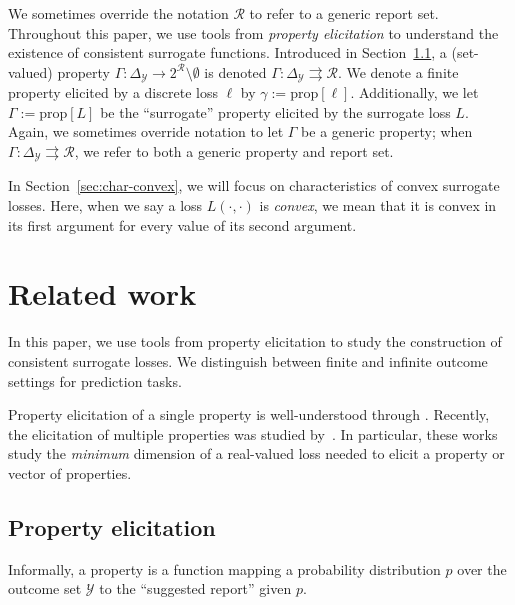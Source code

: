 \documentclass{article}
\newcommand{\simplex}{\Delta_\Y}
\newcommand{\prop}[1]{\mathrm{prop}[#1]}
\newcommand{\R}{\mathcal{R}}
\newcommand{\Y}{\mathcal{Y}}
\newcommand{\toto}{\rightrightarrows}
\begin{document}
We sometimes override the notation $\R$ to refer to a generic report set.
Throughout this paper, we use tools from \emph{property elicitation} to understand the existence of consistent surrogate functions.
Introduced in Section~\ref{subsec:properties}, a (set-valued) property $\Gamma: \simplex \to 2^\R \setminus \emptyset$ is denoted $\Gamma:\simplex \toto \R$.
We denote a finite property elicited by a discrete loss $\ell$ by $\gamma := \prop{\ell}$.
Additionally, we let $\Gamma := \prop{L}$ be the ``surrogate'' property elicited by the surrogate loss $L$.
Again, we sometimes override notation to let $\Gamma$ be a generic property; when $\Gamma: \simplex \toto \R$, we refer to both a generic property and report set.

In Section~\ref{sec:char-convex}, we will focus on characteristics of convex surrogate losses.
Here, when we say a loss $L(\cdot, \cdot)$ is \emph{convex}, we mean that it is convex in its first argument for every value of its second argument.

\section{Related work}\label{sec:related-work}
In this paper, we use tools from property elicitation to study the construction of consistent surrogate losses.
We distinguish between finite and infinite outcome settings for prediction tasks.

Property elicitation of a single property is well-understood through \cite{savage1971elicitation,osband1985information-eliciting,lambert2008eliciting, lambert2009eliciting, lambert2018elicitation}.
Recently, the elicitation of multiple properties was studied by~\cite{frongillo2015vector-valued,frongillo2015elicitation,fissler2015higher}.
In particular, these works study the \emph{minimum} dimension of a real-valued loss needed to elicit a property or vector of properties.


\subsection{Property elicitation}\label{subsec:properties}
Informally, a property is a function mapping a probability distribution $p$ over the outcome set $\Y$ to the ``suggested report'' given $p$.
\end{document}
